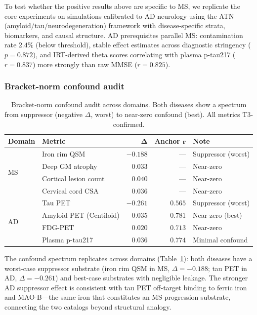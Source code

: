 \documentclass{article}
\begin{document}
To test whether the positive results above are specific to MS, we replicate the core experiments on simulations calibrated to AD neurology using the ATN (amyloid/tau/neurodegeneration) framework \citep{jack2018niaaa} with disease-specific strata, biomarkers, and causal structure.
AD prerequisites parallel MS: contamination rate $2.4\%$ (below threshold), stable effect estimates across diagnostic stringency ($p = 0.872$), and IRT-derived theta scores correlating with plasma p-tau217 ($r = 0.837$) more strongly than raw MMSE ($r = 0.825$).

\subsubsection{Bracket-norm confound audit}

\begin{table}[t]
\centering
\caption{Bracket-norm confound audit across domains. Both diseases show a spectrum from suppressor (negative $\Delta$, worst) to near-zero confound (best). All metrics T3-confirmed.}
\label{tab:p1-cross}
\small
\begin{tabular}{@{}llrrl@{}}
\toprule
\textbf{Domain} & \textbf{Metric} & $\boldsymbol{\Delta}$ & \textbf{Anchor} $\boldsymbol{r}$ & \textbf{Note} \\
\midrule
\multirow{4}{*}{MS}
& Iron rim QSM & $-0.188$ & --- & Suppressor (worst) \\
& Deep GM atrophy & $0.033$ & --- & Near-zero \\
& Cortical lesion count & $0.040$ & --- & Near-zero \\
& Cervical cord CSA & $0.036$ & --- & Near-zero \\
\midrule
\multirow{4}{*}{AD}
& Tau PET & $-0.261$ & $0.565$ & Suppressor (worst) \\
& Amyloid PET (Centiloid) & $0.035$ & $0.781$ & Near-zero (best) \\
& FDG-PET & $0.020$ & $0.713$ & Near-zero \\
& Plasma p-tau217 & $0.036$ & $0.774$ & Minimal confound \\
\bottomrule
\end{tabular}
\end{table}

The confound spectrum replicates across domains (Table~\ref{tab:p1-cross}): both diseases have a worst-case suppressor substrate (iron rim QSM in MS, $\Delta = -0.188$; tau PET in AD, $\Delta = -0.261$) and best-case substrates with negligible leakage.
The stronger AD suppressor effect is consistent with tau PET off-target binding to ferric iron and MAO-B---the same iron that constitutes an MS progression substrate, connecting the two catalogs beyond structural analogy.
\end{document}
